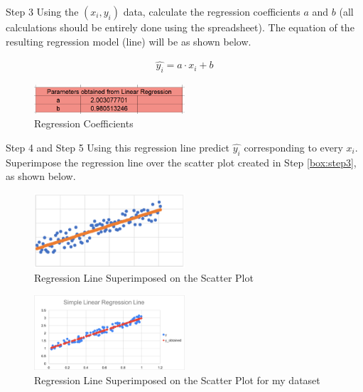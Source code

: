 \begin{custombox}[label={box:step3}]{Step 3}
	Using the $(x_i, y_i)$ data, calculate the regression coefficients $a$ and $b$ (all calculations should be entirely done using the spreadsheet). The equation of the resulting regression model (line) will be as shown below.

	\begin{align}
		\widehat{y_i} = {a} \cdot {x_i} + b
	\end{align}
\end{custombox}

\begin{figure}[H]
	\centering
	\includegraphics[width=0.5\textwidth]{Images/parameters-linear-regression.png}
	\caption{Regression Coefficients}
\end{figure}

\begin{custombox}[label={box:step4and5}]{Step 4 and Step 5}
	Using this regression line predict $\widehat{y_i}$ corresponding to every $x_i$. Superimpose the regression line over the scatter plot created in Step \ref{box:step3}, as shown below.

	\begin{figure}[H]
		\centering
		\includegraphics[width=0.5\textwidth]{Images/Step45.png}
		\caption{Regression Line Superimposed on the Scatter Plot}
	\end{figure}
\end{custombox}

\begin{figure}[H]
	\centering
	\includegraphics[width=0.5\textwidth]{Images/regression.png}
	\caption{Regression Line Superimposed on the Scatter Plot for my dataset}
\end{figure}

